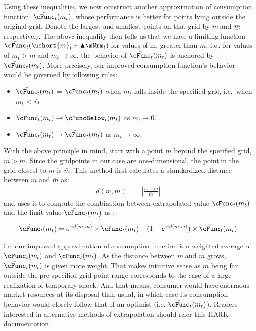 
  Using these inequalities, we now construct another approximation of consumption function, $\tilde{\cFunc}_{t}({m}_{t})$, whose performance is better for points lying outside the original grid. Denote the largest and smallest points on that grid by $\bar{m}$ and $\underaccent{\bar}{m}$ respectively.  The above inequality then tells us that we have a limiting function $ \bar{\cFunc}_{t}(\ushort{m}_{t}+\aboveMin \mNrm_{t})$ for values of m, greater than $\bar{m}$, i.e., for values of $m_t > \bar{m} $  and $m_t \rightarrow \infty $, the behavior of $\tilde{\cFunc}_{t}({m}_{t})$ is anchored by $ \bar{\cFunc}_{t}({m}_{t})$. More precisely, our improved consumption function's behavior would be governed by following  rules:
\begin{itemize}
\item $\tilde{\cFunc}_{t}({m}_{t})$  = $ \cFunc_{t}({m}_{t})$ when $m_t$ falls inside the specified grid, i.e.\ when $m_t$ < $\bar{m}$
\item $\tilde{\cFunc}_{t}({m}_{t})  \rightarrow    \cFuncBelow_{t}(m_{t})  $  as $m_t \rightarrow 0$.
\item $\tilde{\cFunc}_{t}({m}_{t})  \rightarrow   \bar{\cFunc}_{t}({m}_{t}) $  as $m_t \rightarrow \infty$.
\end{itemize}

With the above principle in mind, start with a point $m$ beyond the specified grid, $m > \bar{m}$. Since the gridpoints in our case are one-dimensional, the point in the grid closest to $m$ is $\bar{m}$. This method first calculates a standardized distance between $m$ and $\bar{m}$ as:
\begin{align*}
  d(m, \bar{m}) & =  \left| \frac{m - \bar{m}}{\bar{m}} \right|
\end{align*}
and uses it to compute the combination between extrapolated value  $ \cFunc_{t}({m}_{t})$ and the limit-value $\bar{\cFunc}_{t}({m}_{t}) $ as :

\[  \tilde{\cFunc}_{t}({m}_{t}) = e^{-d(m, \bar{m})} \times   \cFunc_{t}({m}_{t})  +  (1-e^{-d(m, \bar{m})})\times  \bar{\cFunc}_{t}({m}_{t})\]

i.e. our improved approximation of consumption function is a weighted average of  $ \cFunc_{t}({m}_{t})$ and  $\bar{\cFunc}_{t}({m}_{t}) $. As the distance between $m$ and $\bar{m}$ grows,  $\bar{\cFunc}_{t}({m}_{t})$ is given more weight. That makes intuitive sense as $m$ being far outside the pre-specified grid point range corresponds to the case of a large realization of temporary shock. And that means, consumer would have enormous market resources at its disposal than usual, in which case its consumption behavior would closely follow that of an optimist (i.e. $\bar{\cFunc}_{t}({m}_{t})$).
Readers interested in alternative methods of extrapolation should refer this HARK \href{https://github.com/econ-ark/HARK/blob/master/examples/Interpolation/DecayInterp.ipynb}{documentation}.

